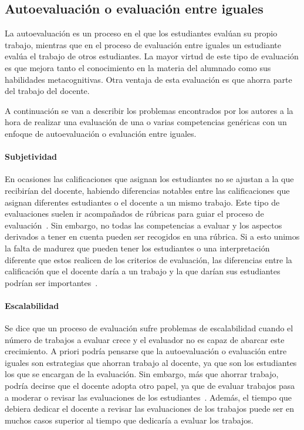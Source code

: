 \subsection*{Autoevaluación o evaluación entre iguales} \label{cha:pro-sec:aut}

La autoevaluación es un proceso en el que los estudiantes evalúan su propio trabajo, mientras que  en el proceso de evaluación entre iguales un estudiante evalúa el trabajo de otros estudiantes. La mayor virtud de este tipo de evaluación es que mejora tanto el conocimiento en la materia del alumnado como sus habilidades metacognitivas. Otra ventaja de esta evaluación es que ahorra parte del trabajo del docente.

A continuación se van a describir los problemas encontrados por los autores a la hora de realizar una evaluación de una o varias competencias genéricas con un enfoque de autoevaluación o evaluación entre iguales.

\paragraph*{Subjetividad}
En ocasiones las calificaciones que asignan los estudiantes no se ajustan a la que recibirían del docente, habiendo diferencias notables entre las calificaciones que asignan diferentes estudiantes o el docente a un mismo trabajo. Este tipo de evaluaciones suelen ir acompañados de rúbricas para guiar el proceso de evaluación~\cite{malehorn1994ten}. Sin embargo, no todas las competencias a evaluar y los aspectos derivados a tener en cuenta pueden ser recogidos en una rúbrica. Si a esto unimos la falta de madurez que pueden tener los estudiantes o una interpretación diferente que estos realicen de los criterios de evaluación, las diferencias entre la calificación que el docente daría a un trabajo y la que darían sus estudiantes podrían ser importantes~\cite{carreras2013promotion}. %

\paragraph*{Escalabilidad}
Se dice que un proceso de evaluación sufre problemas de escalabilidad cuando el número de trabajos a evaluar crece y el evaluador no es capaz de abarcar este crecimiento. A priori podría pensarse que la autoevaluación o evaluación entre iguales son estrategias que ahorran trabajo al docente, ya que son los estudiantes los que se encargan de la evaluación. Sin embargo, más que ahorrar trabajo, podría decirse que el docente adopta otro papel, ya que de evaluar trabajos pasa a moderar o revisar las evaluaciones de los estudiantes~\cite{bostock2000student}. Además, el tiempo que debiera dedicar el docente a revisar las evaluaciones de los trabajos puede ser en muchos casos superior al tiempo que dedicaría a evaluar los trabajos.

